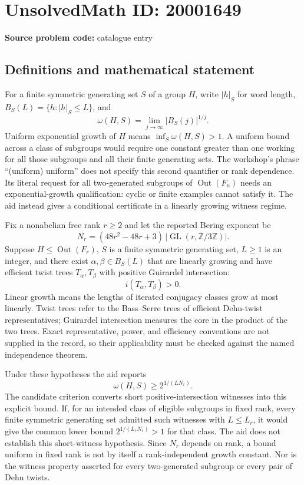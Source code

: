 \documentclass[11pt]{article}
\newcommand{\Z}{\mathbb{Z}}
\begin{document}
\section*{UnsolvedMath ID: 20001649}
\textbf{Source problem code:} catalogue entry
\subsection{Definitions and mathematical statement}
For a finite symmetric generating set \(S\) of a group \(H\), write \(|h|_S\) for word length, \(B_S(L)=\{h:|h|_S\le L\}\), and
\[
 \omega(H,S)=\lim_{j\to\infty}|B_S(j)|^{1/j}.
\]
Uniform exponential growth of \(H\) means \(\inf_S\omega(H,S)>1\). A uniform bound across a class of subgroups would require one constant greater than one working for all those subgroups and all their finite generating sets. The workshop's phrase ``(uniform) uniform'' does not specify this second quantifier or rank dependence. Its literal request for all two-generated subgroups of \(\operatorname{Out}(F_n)\) needs an exponential-growth qualification: cyclic or finite examples cannot satisfy it. The aid instead gives a conditional certificate in a linearly growing witness regime.

Fix a nonabelian free rank \(r\ge2\) and let the reported Bering exponent be
\[
 N_r=(48r^2-48r+3)\,|\operatorname{GL}(r,\Z/3\Z)|.
\]
Suppose \(H\le\operatorname{Out}(F_r)\), \(S\) is a finite symmetric generating set, \(L\ge1\) is an integer, and there exist \(\alpha,\beta\in B_S(L)\) that are linearly growing and have efficient twist trees \(T_\alpha,T_\beta\) with positive Guirardel intersection:
\[
 i(T_\alpha,T_\beta)>0.
\]
Linear growth means the lengths of iterated conjugacy classes grow at most linearly. Twist trees refer to the Bass--Serre trees of efficient Dehn-twist representatives; Guirardel intersection measures the core in the product of the two trees. Exact representative, power, and efficiency conventions are not supplied in the record, so their applicability must be checked against the named independence theorem.

Under these hypotheses the aid reports
\[
 \omega(H,S)\ge 2^{1/(L N_r)}.
\]
The candidate criterion converts short positive-intersection witnesses into this explicit bound. If, for an intended class of eligible subgroups in fixed rank, every finite symmetric generating set admitted such witnesses with \(L\le L_r\), it would give the common lower bound \(2^{1/(L_rN_r)}>1\) for that class. The aid does not establish this short-witness hypothesis. Since \(N_r\) depends on rank, a bound uniform in fixed rank is not by itself a rank-independent growth constant. Nor is the witness property asserted for every two-generated subgroup or every pair of Dehn twists.
\end{document}
